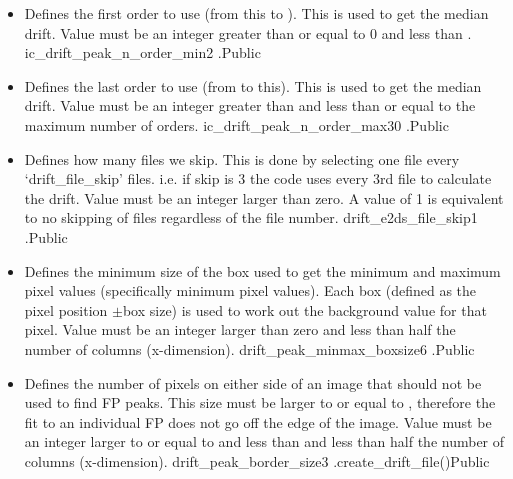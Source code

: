 \begin{itemize}

\item {} 
{Defines the first order to use (from this to ). This is used to get the median drift. Value must be an integer greater than or equal to 0 and less than .}
{ic\_drift\_peak\_n\_order\_min}{2}
{\calDRIFTPEAK}{\constantsfile}{\calDRIFTPEAK.\progMAIN}{Public}

\item {} 
{Defines the last order to use (from  to this). This is used to get the median drift. Value must be an integer greater than  and less than or equal to the maximum number of orders.}
{ic\_drift\_peak\_n\_order\_max}{30}
{\calDRIFTPEAK}{\constantsfile}{\calDRIFTPEAK.\progMAIN}{Public}

\item {}
{Defines how many files we skip. This is done by selecting one file every `drift\_file\_skip' files. i.e. if skip is 3 the code uses every 3rd file to calculate the drift. Value must be an integer larger than zero. A value of 1 is equivalent to no skipping of files regardless of the file number.}
{drift\_e2ds\_file\_skip}{1}
{\calDRIFTPEAK}{\constantsfile}{\calDRIFTPEAK.\progMAIN}{Public}

\item {}
{Defines the minimum size of the box used to get the minimum and maximum pixel values (specifically minimum pixel values). Each box (defined as the pixel position $\pm$box size) is used to work out the background value for that pixel. Value must be an integer larger than zero and less than half the number of columns (x-dimension).}
{drift\_peak\_minmax\_boxsize}{6}
{\calDRIFTPEAK}{\constantsfile}{\calDRIFTPEAK.\progMAIN}{Public}

\item {} 
{Defines the number of pixels on either side of an image that should not be used to find FP peaks. This size must be larger to or equal to , therefore the fit to an individual FP does not go off the edge of the image. Value must be an integer larger to or equal to  and less than and less than half the number of columns (x-dimension).}
{drift\_peak\_border\_size}{3}
{\calDRIFTPEAK}{\constantsfile}{\spirouRV.create\_drift\_file()}{Public}


\end{itemize}
